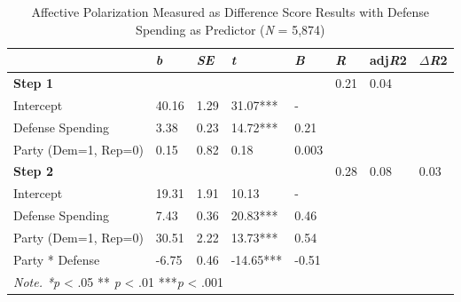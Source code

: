 \documentclass[authordate, meta, issue]{jote-new-article}
\begin{document}
\begin{center}
\begin{minipage}{\textwidth}
\begin{fullwidth}
		\end{fullwidth}
	\end{minipage}
        
        \vspace*{\fill}
    \end{center}




\clearpage

	
		
	\begin{table}[H]
		\begin{fullwidth}
    \centering
	\caption{Affective Polarization Measured as Difference Score Results with Defense Spending as Predictor (\emph{N} = 5,874)}
    \begin{tabular}{l l l l l l l l}
        \hline 
        & \emph{b} & \emph{SE} & \emph{t} & \emph{B} & \emph{R} & adj\emph{R}2 & $\Delta$\emph{R}2 \\ \hline

        \textbf{Step 1} & & & & & 0.21 & 0.04 & \\ 
        Intercept & 40.16 & 1.29 & 31.07*** & - & & & \\
        Defense Spending & 3.38 & 0.23 & 14.72*** & 0.21 & & & \\
        Party (Dem=1, Rep=0) & 0.15 & 0.82 & 0.18 & 0.003 & & & \\ \hline

        \textbf{Step 2} & & & & & 0.28 & 0.08 & 0.03 \\
        Intercept & 19.31 & 1.91 & 10.13 & - & & & \\
        Defense Spending & 7.43 & 0.36 & 20.83*** & 0.46 & & & \\
        Party (Dem=1, Rep=0) & 30.51 & 2.22 & 13.73*** & 0.54 & & & \\
        Party * Defense & -6.75 & 0.46 & -14.65*** & -0.51 & & & \\ \hline
		\multicolumn{8}{l}{\emph{Note. *p }< .05 ** \emph{p }< .01 ***\emph{p} < .001}
    \end{tabular}
	\end{fullwidth}
\end{table}
\end{document}
